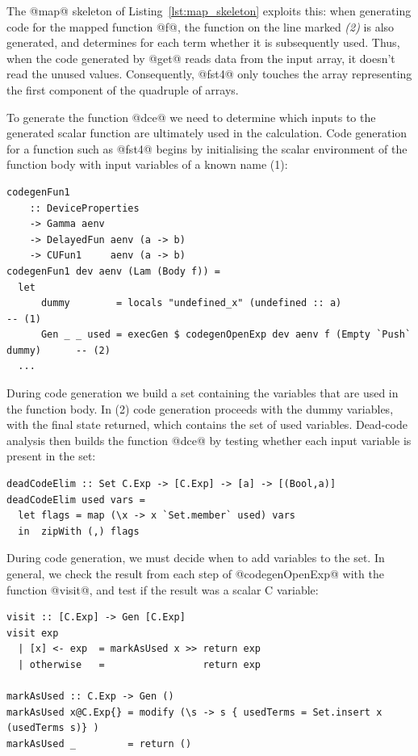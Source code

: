 The @map@ skeleton of Listing~\ref{lst:map_skeleton} exploits this: when
generating code for the mapped function @f@, the function  on the line marked \emph{(2)} is also generated, and determines
for each term whether it is subsequently used. Thus, when the code generated by
@get@ reads data from the input array, it doesn't read the unused values.
Consequently, @fst4@ only touches the array representing the first
component of the quadruple of arrays.

To generate the function @dce@ we need to determine which inputs to the
generated scalar function are ultimately used in the calculation. Code
generation for a function such as @fst4@ begins by initialising the
scalar environment of the function body with input variables of a known name
(1):
%
\begin{lstlisting}[style=haskell]
codegenFun1
    :: DeviceProperties
    -> Gamma aenv
    -> DelayedFun aenv (a -> b)
    -> CUFun1     aenv (a -> b)
codegenFun1 dev aenv (Lam (Body f)) =
  let
      dummy        = locals "undefined_x" (undefined :: a)                         -- (1)
      Gen _ _ used = execGen $ codegenOpenExp dev aenv f (Empty `Push` dummy)      -- (2)
  ...
\end{lstlisting}
%
During code generation we build a set containing the variables that are used in
the function body. In (2) code generation proceeds with the dummy variables,
with the final state returned, which contains the set of used variables.
Dead-code analysis then builds the function @dce@ by testing whether each
input variable is present in the set:
%
\begin{lstlisting}[style=haskell]
deadCodeElim :: Set C.Exp -> [C.Exp] -> [a] -> [(Bool,a)]
deadCodeElim used vars =
  let flags = map (\x -> x `Set.member` used) vars
  in  zipWith (,) flags
\end{lstlisting}

During code generation, we must decide when to add variables to the set. In
general, we check the result from each step of @codegenOpenExp@ with the
function @visit@, and test if the result was a scalar C variable:
%
\begin{lstlisting}[style=haskell]
visit :: [C.Exp] -> Gen [C.Exp]
visit exp
  | [x] <- exp  = markAsUsed x >> return exp
  | otherwise   =                 return exp

markAsUsed :: C.Exp -> Gen ()
markAsUsed x@C.Exp{} = modify (\s -> s { usedTerms = Set.insert x (usedTerms s)} )
markAsUsed _         = return ()
\end{lstlisting}


